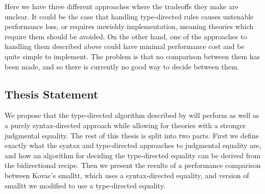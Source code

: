 Here we have three different approaches where the tradeoffs they make are unclear.
It could be the case that handling type-directed rules causes untenable performance loss, or requires unwieldy implementation, meaning theories which require them should be avoided.
On the other hand, one of the approaches to handling them described above could have minimal performance cost and be quite simple to implement.
The problem is that no comparison between them has been made, and so there is currently no good way to decide between them.

\subsection{Thesis Statement}
We propose that the type-directed algorithm described by \citet{Chapman2005} will perform as well as a purely syntax-directed approach while allowing for theories with a stronger judgmental equality.
The rest of this thesis is split into two parts.
First we define exactly what the syntax and type-directed approaches to judgmental equality are, and how an algorithm for deciding the type-directed equality can be derived from the bidirectional recipe.
Then we present the results of a performance comparison between Kovac's smalltt, which uses a syntax-directed equality, and version of smalltt we modified to use a type-directed equality.

